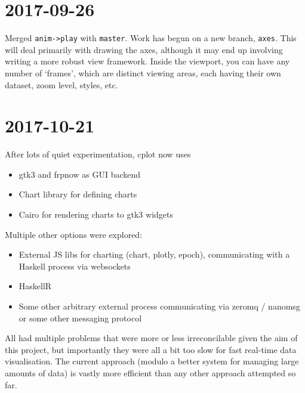 \documentclass[a5paper,10pt]{article}
\begin{document}
    \section*{2017-09-26}

    Merged \verb|anim->play| with \verb|master|. Work has begun on a new branch, \verb|axes|. This will deal primarily with drawing the axes, although it may end up involving writing a more robust view framework. Inside the viewport, you can have any number of `frames', which are distinct viewing areas, each having their own dataset, zoom level, styles, etc.

    \section*{2017-10-21}

    After lots of quiet experimentation, cplot now uses
    \begin{itemize}
        \item gtk3 and frpnow as GUI backend
        \item Chart library for defining charts
        \item Cairo for rendering charts to gtk3 widgets
    \end{itemize}
    Multiple other options were explored:
    \begin{itemize}
        \item External JS libs for charting (chart, plotly, epoch), communicating with a Haskell process via websockets
        \item HaskellR
        \item Some other arbitrary external process communicating via zeromq / nanomsg or some other messaging protocol
    \end{itemize}
    All had multiple problems that were more or less irreconcilable given the aim of this project, but importantly they were all a bit too slow for fast real-time data visualisation. The current approach (modulo a better system for managing large amounts of data) is vastly more efficient than any other approach attempted so far.
\end{document}
